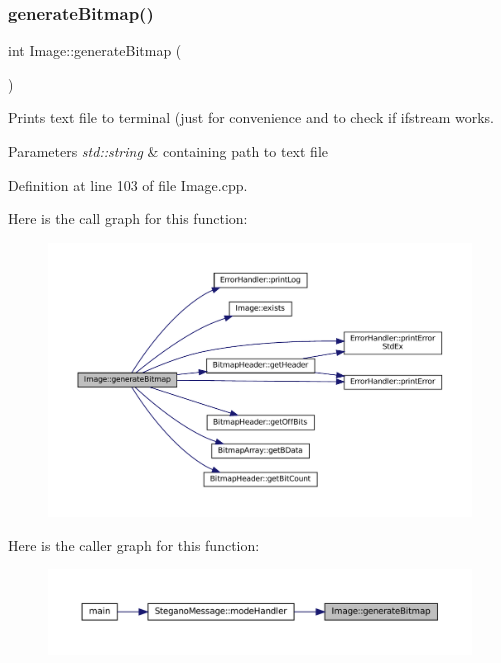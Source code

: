 \subsubsection{\texorpdfstring{generateBitmap()}{generateBitmap()}}
{\footnotesize\ttfamily int Image\+::generate\+Bitmap (\begin{DoxyParamCaption}{ }\end{DoxyParamCaption})}



Prints text file to terminal (just for convenience and to check if ifstream works. 


\begin{DoxyParams}{Parameters}
{\em std\+::string} & containing path to text file \\
\hline
\end{DoxyParams}


Definition at line 103 of file Image.\+cpp.

Here is the call graph for this function\+:\nopagebreak
\begin{figure}[H]
\begin{center}
\leavevmode
\includegraphics[width=350pt]{classImage_a3ca1ae6c1eb2846bfba066b01e6020e1_cgraph}
\end{center}
\end{figure}
Here is the caller graph for this function\+:\nopagebreak
\begin{figure}[H]
\begin{center}
\leavevmode
\includegraphics[width=350pt]{classImage_a3ca1ae6c1eb2846bfba066b01e6020e1_icgraph}
\end{center}
\end{figure}
\mbox{\label{classImage_a75b5051c6cc39a5e3f86d287f5cc7f9c}} 
